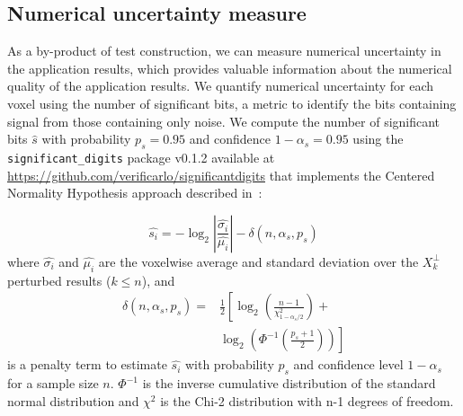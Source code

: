 \documentclass[lettersize,journal]{IEEEtran}
\begin{document}


\subsection{Numerical uncertainty measure}

As a by-product of test construction, we can measure numerical uncertainty in the application results, which provides valuable information about the numerical quality of the application results.
We quantify numerical uncertainty for each voxel using the number of significant bits, a metric to identify the bits containing signal from those containing only noise. We compute the number of significant bits $\hat{s}$ with probability $p_s=0.95$ and confidence $1-\alpha_s=0.95$ using the \texttt{significant\_digits} package v0.1.2 available at \url{https://github.com/verificarlo/significantdigits} that implements the Centered Normality Hypothesis approach described in~\cite{sohier2021confidence}:

\[
    \hat{s_i} = -\log_2 \left| \frac{\hat{\sigma_i}}{\hat{\mu_i}} \right| - \delta(n, \alpha_s, p_s)
\]
where $\hat{\sigma_i}$ and $\hat{\mu_i}$ are the voxelwise average and standard deviation over the $X_k^\perp$ perturbed results ($k \leq n$), and
\begin{equation}
    \begin{split}
        \delta(n, \alpha_s, p_s) =& \frac{1}{2} \left[ \log_2 \left( \frac{n-1}{\chi^2_{1-\alpha_s/2}} \right) + \right. \\
            &  \left. \log_2 \left( \Phi^{-1} \left( \frac{p_s+1}{2} \right) \right) \right]
    \end{split}
\end{equation}
is a penalty term to estimate $\hat{s_i}$ with probability $p_s$ and confidence level $1-\alpha_s$ for a sample size $n$. $\Phi^{-1}$ is the inverse cumulative distribution of the standard normal distribution and $\chi^2$ is the Chi-2 distribution with n-1 degrees of freedom.
\end{document}
